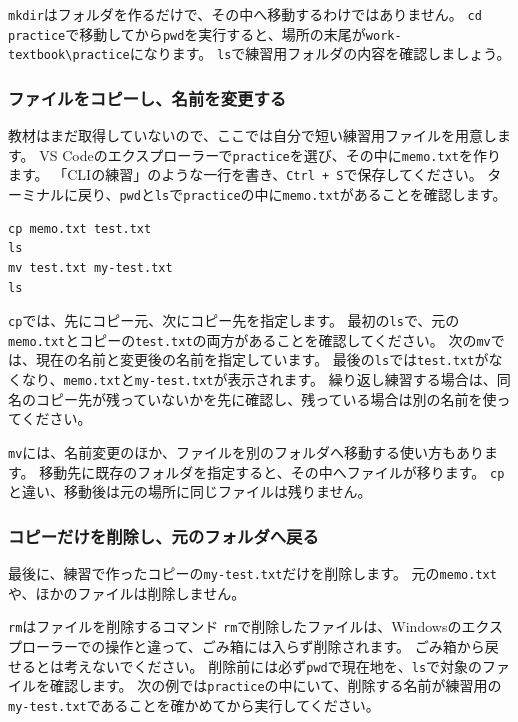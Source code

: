 \texttt{mkdir}はフォルダを作るだけで、その中へ移動するわけではありません。
\texttt{cd practice}で移動してから\texttt{pwd}を実行すると、場所の末尾が\texttt{work-textbook\textbackslash practice}になります。
\texttt{ls}で練習用フォルダの内容を確認しましょう。

\subsubsection*{ファイルをコピーし、名前を変更する}

教材はまだ取得していないので、ここでは自分で短い練習用ファイルを用意します。
VS Codeのエクスプローラーで\texttt{practice}を選び、その中に\texttt{memo.txt}を作ります。
「CLIの練習」のような一行を書き、\texttt{Ctrl + S}で保存してください。
ターミナルに戻り、\texttt{pwd}と\texttt{ls}で\texttt{practice}の中に\texttt{memo.txt}があることを確認します。

\begin{listing}[H]
\begin{verbatim}
cp memo.txt test.txt
ls
mv test.txt my-test.txt
ls
\end{verbatim}
\caption{練習用ファイルをコピーし、コピーの名前を変更する}
\label{lst:chapter01-cli-copy-rename}
\end{listing}

\texttt{cp}では、先にコピー元、次にコピー先を指定します。
最初の\texttt{ls}で、元の\texttt{memo.txt}とコピーの\texttt{test.txt}の両方があることを確認してください。
次の\texttt{mv}では、現在の名前と変更後の名前を指定しています。
最後の\texttt{ls}では\texttt{test.txt}がなくなり、\texttt{memo.txt}と\texttt{my-test.txt}が表示されます。
繰り返し練習する場合は、同名のコピー先が残っていないかを先に確認し、残っている場合は別の名前を使ってください。

\texttt{mv}には、名前変更のほか、ファイルを別のフォルダへ移動する使い方もあります。
移動先に既存のフォルダを指定すると、その中へファイルが移ります。
\texttt{cp}と違い、移動後は元の場所に同じファイルは残りません。

\subsubsection*{コピーだけを削除し、元のフォルダへ戻る}

最後に、練習で作ったコピーの\texttt{my-test.txt}だけを削除します。
元の\texttt{memo.txt}や、ほかのファイルは削除しません。

\begin{notebox}{\texttt{rm}はファイルを削除するコマンド}
\texttt{rm}で削除したファイルは、Windowsのエクスプローラーでの操作と違って、ごみ箱には入らず削除されます。
ごみ箱から戻せるとは考えないでください。
削除前には必ず\texttt{pwd}で現在地を、\texttt{ls}で対象のファイルを確認します。
次の例では\texttt{practice}の中にいて、削除する名前が練習用の\texttt{my-test.txt}であることを確かめてから実行してください。
\end{notebox}

